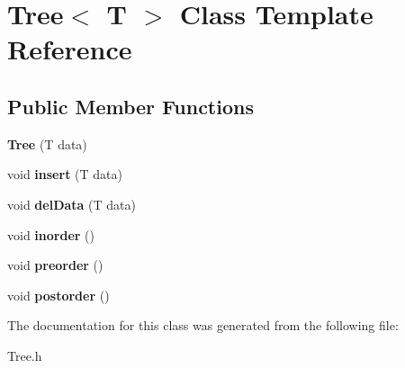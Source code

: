 \hypertarget{class_tree}{}\section{Tree$<$ T $>$ Class Template Reference}
\label{class_tree}
\subsection*{Public Member Functions}
\begin{DoxyCompactItemize}
\item 
\hypertarget{class_tree_ade4d2a6282967bbe2ad5157e056d1562}{}\label{class_tree_ade4d2a6282967bbe2ad5157e056d1562} 
{\bfseries Tree} (T data)
\item 
\hypertarget{class_tree_acd9f0f2770d1ac3a0d1eb06adf440bfd}{}\label{class_tree_acd9f0f2770d1ac3a0d1eb06adf440bfd} 
void {\bfseries insert} (T data)
\item 
\hypertarget{class_tree_a0cf05e9913dbde6e8baddb9f1a47e2e3}{}\label{class_tree_a0cf05e9913dbde6e8baddb9f1a47e2e3} 
void {\bfseries del\+Data} (T data)
\item 
\hypertarget{class_tree_a98e34a9512a9ad0976e5f01a5929ece8}{}\label{class_tree_a98e34a9512a9ad0976e5f01a5929ece8} 
void {\bfseries inorder} ()
\item 
\hypertarget{class_tree_aa4bf22a16f288a07748453e7743f237a}{}\label{class_tree_aa4bf22a16f288a07748453e7743f237a} 
void {\bfseries preorder} ()
\item 
\hypertarget{class_tree_a65fe43ab3e27e1c5a61f816fc802706b}{}\label{class_tree_a65fe43ab3e27e1c5a61f816fc802706b} 
void {\bfseries postorder} ()
\end{DoxyCompactItemize}


The documentation for this class was generated from the following file\+:\begin{DoxyCompactItemize}
\item 
Tree.\+h\end{DoxyCompactItemize}
